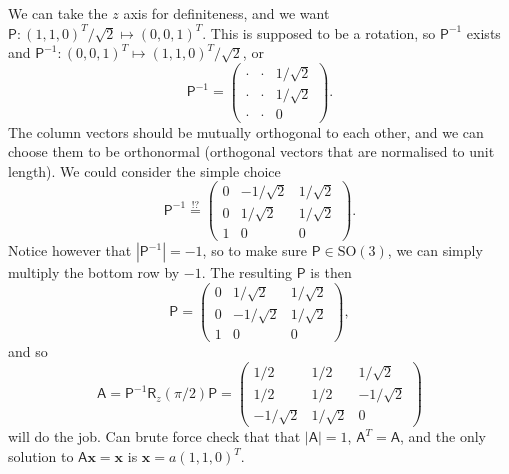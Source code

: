 \documentclass[letter-paper]{tufte-book}
\newenvironment{example}[1][Example]{\begin{trivlist}
\item[\hskip \labelsep {\bfseries #1}]}{\end{trivlist}}
\newcommand{\As}{{\mathsf{A}}}
\newcommand{\Ps}{{\mathsf{P}}}
\newcommand{\xb}{{\boldsymbol{x}}}
\begin{document}
\begin{example}
  We can take the $z$ axis for definiteness, and we want $\Ps: (1,1,0)^T/\sqrt{2} \mapsto (0,0,1)^T$. This is supposed to be a rotation, so $\Ps^{-1}$ exists and $\Ps^{-1}:(0,0,1)^T \mapsto (1,1,0)^T/\sqrt{2}$, or
  \begin{equation*}
    \Ps^{-1} = \begin{pmatrix}\cdot & \cdot & 1/\sqrt{2} \\ \cdot & \cdot & 1/\sqrt{2} \\ \cdot & \cdot & 0\end{pmatrix}.
  \end{equation*}
  The column vectors should be mutually orthogonal to each other, and we can choose them to be orthonormal (orthogonal vectors that are normalised to unit length). We could consider the simple choice
  \begin{equation*}
    \Ps^{-1} \stackrel{!?}{=} \begin{pmatrix}0 & -1/\sqrt{2} & 1/\sqrt{2} \\ 0 & 1/\sqrt{2} & 1/\sqrt{2} \\ 1 & 0 & 0\end{pmatrix}.
  \end{equation*}
  Notice however that $|\Ps^{-1}|=-1$, so to make sure $\Ps\in\mbox{SO}(3)$, we can simply multiply the bottom row by $-1$. The resulting $\Ps$ is then
  \begin{equation*}
    \Ps = \begin{pmatrix}0 & 1/\sqrt{2} & 1/\sqrt{2} \\ 0 & -1/\sqrt{2} & 1/\sqrt{2} \\ 1 & 0 & 0\end{pmatrix},
  \end{equation*}
  and so
  \begin{equation*}
    \As = \Ps^{-1} \mathsf{R}_z(\pi/2) \Ps = \begin{pmatrix}1/2 & 1/2 & 1/\sqrt{2} \\ 1/2 & 1/2 & -1/\sqrt{2} \\ -1/\sqrt{2} & 1/\sqrt{2} & 0\end{pmatrix}
  \end{equation*}
  will do the job. Can brute force check that that $|\As|=1$, $\As^T = \As$, and the only solution to $\As\xb = \xb$ is $\xb = a(1, 1, 0)^T$.
\end{example}

\end{document}
